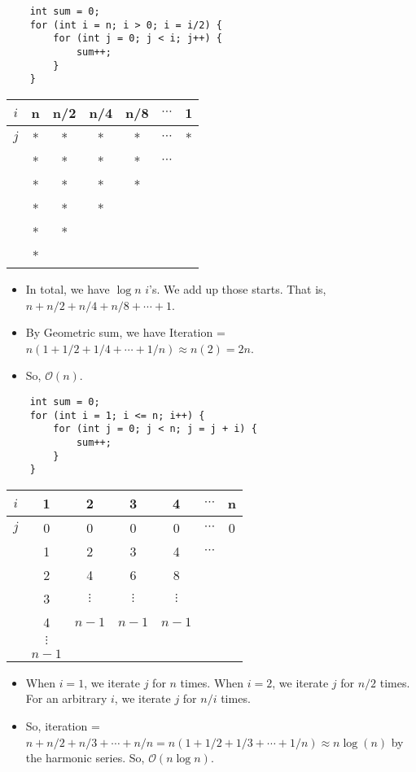 \documentclass[12pt, a4paper]{article}
\def\O{\mathcal{O}}
\begin{document}
\begin{lstlisting}
	int sum = 0;
	for (int i = n; i > 0; i = i/2) {
		for (int j = 0; j < i; j++) {
			sum++;
		}
	}
\end{lstlisting}
\begin{center}\begin{tabular}{c|c|c|c|c|c|c}
	$i$&n&n/2&n/4&n/8&$\cdots$&1\\\hline
	$j$&*&*&*&*&$\cdots$&*\\
	&*&*&*&*&$\cdots$&\\
	&*&*&*&*&&\\
	&*&*&*&&&\\
	&*&*&&&&\\
	&*&&&&
\end{tabular}\end{center}
\begin{itemize}
	\item In total, we have $\log{n}$ $i$'s. We add up those starts. That is, $n+n/2+n/4+n/8+\cdots+1$.
	\item By Geometric sum, we have Iteration = $n(1+1/2+1/4+\cdots+1/n)\approx n(2)=2n$. 
	\item So, $\O(n)$.
\end{itemize}
\begin{lstlisting}
	int sum = 0;
	for (int i = 1; i <= n; i++) {
		for (int j = 0; j < n; j = j + i) {
			sum++;
		}
	}
\end{lstlisting}
\begin{center}\begin{tabular}{c|c|c|c|c|c|c}
	$i$&1&2&3&4&$\cdots$&n\\\hline
	$j$&0&0&0&0&$\cdots$&0\\
	&1&2&3&4&$\cdots$&\\
	&2&4&6&8&&\\
	&3&$\vdots$&$\vdots$&$\vdots$&&\\
	&4&$n-1$&$n-1$&$n-1$&&\\
	&$\vdots$&&&&\\
	&$n-1$&&&&
\end{tabular}\end{center}
\begin{itemize}
	\item When $i=1$, we iterate $j$ for $n$ times. When $i=2$, we iterate $j$ for $n/2$ times. For an arbitrary $i$, we iterate $j$ for $n/i$ times.
	\item So, iteration = $n+n/2+n/3+\cdots+n/n=n(1+1/2+1/3+\cdots+1/n)\approx n\log(n)$ by the harmonic series. So, $\O(n\log{n})$.
\end{itemize}
\end{document}
